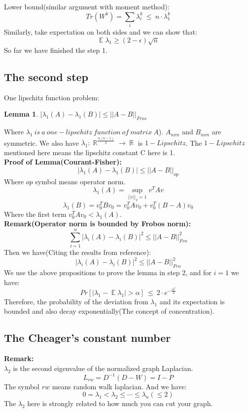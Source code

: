 \documentclass{article}
\DeclareMathOperator{\E}{\mathbb{E}}
\DeclareMathOperator{\R}{\mathbb{R}}
\newtheorem{lemma}[theorem]{Lemma}
\begin{document}
\noindent
Lower bound(similar argument with moment method):
\[
Tr(W^k) = \sum_i \lambda_i^k~{\leq}~n{\cdot}\lambda_1^k
\]
Similarly, take expectation on both sides and we can show that:
\[
\E \lambda_1 {\geq} (2-\epsilon)\sqrt{n}
\]
So far we have finished the step 1.  

\subsection{The second step}
One lipschitz function problem:
\begin{lemma}
$|\lambda_1(A) - \lambda_1(B)| {\leq} ||A-B||_{Fros}$
\end{lemma}
Where $\lambda_1~is~a~one-lipschitz~function~of~matrix~A$). $A_{nxn}$ and $B_{nxn}$ are symmetric. We also have $\lambda_1:\R ^{\frac{n(n-1)}{2}}\rightarrow \R$ is $1-Lipschitz$. The $1-Lipschitz$ mentioned here means the lipschitz constant C here is 1.\\

\noindent
\textbf{Proof of Lemma(Courant-Fisher):}
\[
|\lambda_1(A) - \lambda_1(B)|{\leq}||A-B||_{op}
\]
Where $op$ symbol means operator norm.
\[
\lambda_1(A) = \mathop{sup}\limits_{||v||_2 =1}v^TAv
\]
\[
\lambda_1(B) = v_0^TBv_0 = v_0^TAv_0 + v_0^T(B-A)v_0
\]
Where the first term $v_0^TAv_0<\lambda_1(A)$.\\

\noindent
\textbf{Remark(Operator norm is bounded by Frobos norm):}
\[
\sum_{i=1}^{n}|\lambda_i(A) - \lambda_i(B)|^2 {\leq} ||A-B||_{Fro}^2
\]
Then we have(Citing the results from reference):
\[
|\lambda_i(A) - \lambda_i(B)|^2 {\leq} ||A-B||_{Fro}^2
\]
We use the above propositions to prove the lemma in step 2, and for $i=1$ we have:
\[
Pr[|\lambda_1 - \E \lambda_1|>\alpha]~{\leq}~2{\cdot}e^{-\frac{\alpha^2}{2}}
\]
Therefore, the probability of the deviation from $\lambda_1$ and its expectation is bounded and also decay exponentially(The concept of concentration).

\subsection{The Cheager's constant number}
\noindent
\textbf{Remark:}\\
\noindent
$\lambda_2$ is the second eigenvalue of the normalized graph Laplacian.
\[
L_{rw} = D^{-1}(D-W) = I - P
\] 
The symbol $rw$ means random walk laplacian. And we have:
\[
0 = \lambda_1<\lambda_2{\leq}{\cdots}{\leq}\lambda_n({\leq}2)
\]
The $\lambda_2$ here is strongly related to how much you can cut your graph.\\
\end{document}
